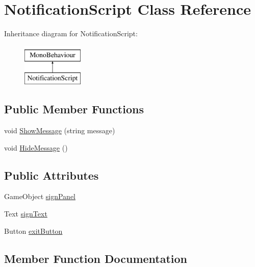 \hypertarget{classNotificationScript}{}\section{Notification\+Script Class Reference}
\label{classNotificationScript}
Inheritance diagram for Notification\+Script\+:\begin{figure}[H]
\begin{center}
\leavevmode
\includegraphics[height=2.000000cm]{classNotificationScript}
\end{center}
\end{figure}
\subsection*{Public Member Functions}
\begin{DoxyCompactItemize}
\item 
void \hyperlink{classNotificationScript_a3f6bb50603023cb1a5e8ed709109d3d2}{Show\+Message} (string message)
\item 
void \hyperlink{classNotificationScript_a3b24014ad0a03c17ba526f3d3eb74753}{Hide\+Message} ()
\end{DoxyCompactItemize}
\subsection*{Public Attributes}
\begin{DoxyCompactItemize}
\item 
Game\+Object \hyperlink{classNotificationScript_a270356455347d9eb5ef0ce6debc3e327}{sign\+Panel}
\item 
Text \hyperlink{classNotificationScript_ac14b3bfa5562f9d974ccf25117106ae1}{sign\+Text}
\item 
Button \hyperlink{classNotificationScript_acf8e4b1a8891c17af2c8880ed9cec149}{exit\+Button}
\end{DoxyCompactItemize}


\subsection{Member Function Documentation}
\mbox{\label{classNotificationScript_a3b24014ad0a03c17ba526f3d3eb74753}} 

